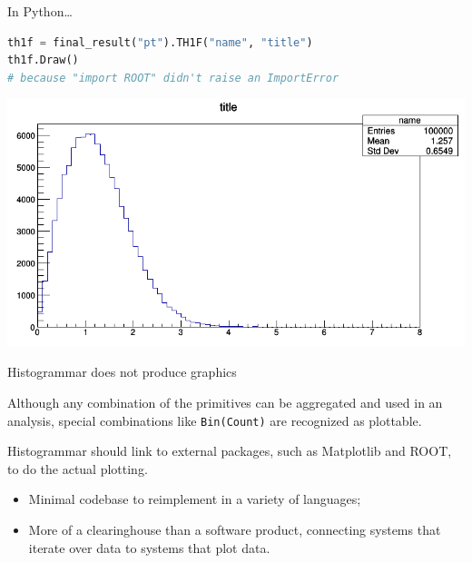 \documentclass{beamer}
\begin{document}
\begin{frame}[fragile]{In Python\ldots}
\begin{lstlisting}[language=python]
th1f = final_result("pt").TH1F("name", "title")
th1f.Draw()
# because "import ROOT" didn't raise an ImportError
\end{lstlisting}

\includegraphics[width=\linewidth]{root_th1f.png}
\end{frame}

\begin{frame}{Histogrammar does not produce graphics}

\vfill
Although any combination of the primitives can be aggregated and used in an analysis, special combinations like {\tt Bin(Count)} are recognized as plottable.

\vfill
Histogrammar should link to external packages, such as Matplotlib and ROOT, to do the actual plotting.
\begin{itemize}
\item Minimal codebase to reimplement in a variety of languages;
\item More of a clearinghouse than a software product, connecting systems that iterate over data to systems that plot data.
\end{itemize}
\end{frame}
\end{document}
